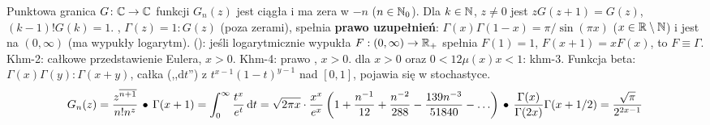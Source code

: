 Punktowa  granica $G \colon \mathbb{C} \to \mathbb{C}$ funkcji $G_n(z)$ jest  ciągła  i ma zera w $-n$ ($n \in \mathbb{N}_0$).
Dla $k \in \mathbb{N}$, $z \neq 0$ jest $z G(z+1) = G(z)$, $(k-1)! G(k) = 1$.
, $\Gamma(z) = 1 : G(z)$ (poza zerami), spełnia \textbf{prawo uzupełnień}: $\Gamma(x)\Gamma (1-x) = \pi / \sin(\pi x)$ ($x \in \mathbb{R} \setminus \mathbb{N}$) i jest  na $(0, \infty)$ (ma wypukły logarytm).
 (): jeśli logarytmicznie wypukła $F: (0, \infty) \to \mathbb{R}_+$ spełnia $F(1) = 1$, $F(x+1) = xF(x)$, to $F \equiv \Gamma$.
Khm-2: całkowe przedstawienie Eulera, $x > 0$.
Khm-4: prawo , $x > 0$.
 dla $x > 0$ oraz $0 < 12 \mu(x) x < 1$: khm-3.
Funkcja beta: $\Gamma(x) \Gamma(y):\Gamma(x+y)$, całka (,,$\textrm{d}t$'') z $t^{x-1} (1-t)^{y-1}$ nad $[0,1]$, pojawia się w stochastyce.
\[
	G_n(z) = \frac{z^{\overline{n+1}}}{n! n^z} \, \bullet \,
	\Gamma(x+1) = \int_0^\infty \frac{t^{x}}{e^t} \,\textrm{d}t = \sqrt{2 \pi x} \cdot \frac{x^x}{e^x} \left(1 + \frac{n^{-1}}{12} + \frac{n^{-2}}{288} - \frac{139n^{-3}}{51840} - \ldots\right) \, \bullet \,
	\frac{\Gamma(x)}{\Gamma(2x)} \Gamma(x + 1/2) = \frac{\sqrt \pi}{2^{2x-1}} 
\]